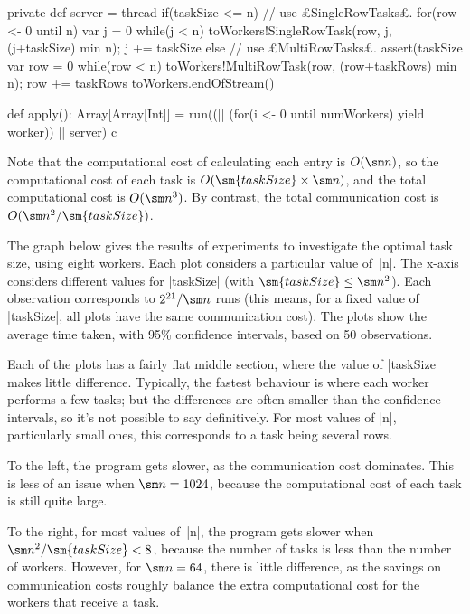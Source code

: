 \begin{answerI}
\begin{scala}
{  private def server = thread{
    if(taskSize <= n){ // use £SingleRowTasks£.
      for(row <- 0 until n){
        var j = 0
        while(j < n){ 
          toWorkers!SingleRowTask(row, j, (j+taskSize) min n); j += taskSize
        }
      }
    }
    else{ // use £MultiRowTasks£.
      assert(taskSize%
      var row = 0
      while(row < n){
        toWorkers!MultiRowTask(row, (row+taskRows) min n); row += taskRows
      }
    }
    toWorkers.endOfStream()
  }

  def apply(): Array[Array[Int]] = {
    run((|| (for(i <- 0 until numWorkers) yield worker)) || server)
    c
  }
}
\end{scala}


Note that the computational cost of calculating each entry is $O(\sm n)$, so
the computational cost of each task is $O(\sm{taskSize} \times \sm n)$, and
the total computational cost is $O(\sm n^3)$.  By contrast, the total
communication cost is $O(\sm n^2 / \sm{taskSize})$.

The graph below gives the results of experiments to investigate the optimal
task size, using eight workers.  Each plot considers a particular value
of~|n|.  The x-axis considers different values for |taskSize| (with
$\sm{taskSize} \le \sm n^2$).  Each observation corresponds to $2^{21}/\sm n$
runs (this means, for a fixed value of |taskSize|, all plots have the same
communication cost).  The plots show the average time taken, with 95\%
confidence intervals, based on 50 observations.

\begin{center}

\end{center}

Each of the plots has a fairly flat middle section, where the value of
|taskSize| makes little difference.  Typically, the fastest behaviour is where
each worker performs a few tasks; but the differences are often smaller than
the confidence intervals, so it's not possible to say definitively.  For most 
values of |n|, particularly small ones, this corresponds to a task being
several rows. 

To the left, the program gets slower, as the communication cost dominates.
This is less of an issue when $\sm n = 1024$, because the computational cost
of each task is still quite large.

To the right, for most values of~|n|, the program gets slower when $\sm n^2 /
\sm{taskSize} < 8$, because the number of tasks is less than the number of
workers.  However, for $\sm n = 64$, there is little difference, as the
savings on communication costs roughly balance the extra computational cost
for the workers that receive a task.
\end{answerI}

